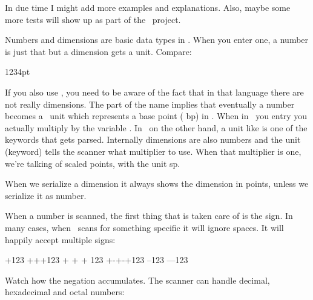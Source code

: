 In due time I might add more examples and explanations. Also, maybe some more
tests will show up as part of the \LUAMETATEX\ project.

\stopsubsection

\startsubsection[title={Number and dimensions}]

Numbers and dimensions are basic data types in \TEX. When you enter one, a number
is just that but a dimension gets a unit. Compare:

1234pt
\stoptyping

If you also use \METAPOST, you need to be aware of the fact that in that language
there are not really dimensions. The  part of the name implies that
eventually a number becomes a \POSTSCRIPT\ unit which represents a base point (\type
{bp}) in \TEX. When in \METAPOST\ you entry \type {1234pt} you actually multiply
 by the variable . In \TEX\ on the other hand, a unit like
 is one of the keywords that gets parsed. Internally dimensions are
also numbers and the unit (keyword) tells the scanner what multiplier to use.
When that multiplier is one, we're talking of scaled points, with the unit \type
{sp}.

\startbuffer
\the\dimexpr 12.34pt \relax
\the\dimexpr 12.34sp \relax
\the\dimexpr 12.99sp \relax
\the\dimexpr 1234sp  \relax
\the{}    \relax
\stopbuffer

\typebuffer[option=TEX]

\startlines \getbuffer \stoplines

When we serialize a dimension it always shows the dimension in points, unless we
serialize it as number.

\startbuffer
{}
\number\scratchdimen
\the\scratchdimen
\stopbuffer

\typebuffer[option=TEX]

\startlines \getbuffer \stoplines

When a number is scanned, the first thing that is taken care of is the sign. In many
cases, when \TEX\ scans for something specific it will ignore spaces. It will
happily accept multiple signs:

\startbuffer
\number +123
\number +++123
\number + + + 123
\number +-+-+123
\number --123
\number ---123
\stopbuffer

\typebuffer[option=TEX]

\startlines \getbuffer \stoplines

Watch how the negation accumulates. The scanner can handle decimal, hexadecimal
and octal numbers:

